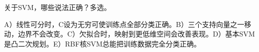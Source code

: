 关于SVM，哪些说法正确？多选。


A）线性可分时，C设为无穷可使训练点全部分类正确。B）三个支持向量之一移动，边界不会改变。C）欠拟合时，映射到更低维空间会改善表现。D）基本SVM是凸二次规划。E）RBF核SVM总能把训练数据完全分类正确。
